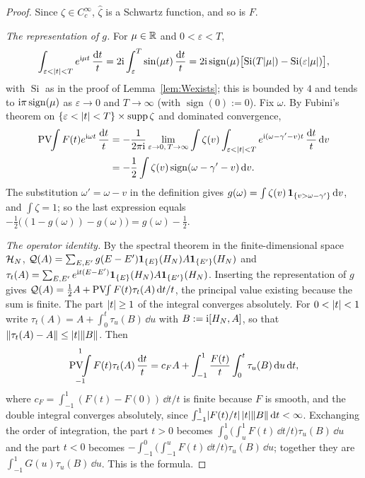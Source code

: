 \begin{proof}
Since $\zeta\in C_c^\infty$, $\hat\zeta$ is a Schwartz function, and so is $F$.

\emph{The representation of $g$.} For $\mu\in\mathbb{R}$ and $0<\varepsilon<T$,
\[
\int_{\varepsilon<\lvert t\rvert<T}e^{\mathrm{i}\mu t}\,\frac{\mathrm{d} t}t=2\mathrm{i}\int_\varepsilon^T\sin(\mu t)\,\frac{\mathrm{d} t}t
=2\mathrm{i}\operatorname{sign}(\mu)\bigl[\operatorname{Si}(T\lvert\mu\rvert)-\operatorname{Si}(\varepsilon\lvert\mu\rvert)\bigr],
\]
with $\operatorname{Si}$ as in the proof of Lemma~\ref{lem:Wexists}; this is bounded by $4$ and tends to
$\mathrm{i}\pi\operatorname{sign}(\mu)$ as $\varepsilon\to0$ and $T\to\infty$ (with $\operatorname{sign}(0):=0$). Fix $\omega$. By
Fubini's theorem on $\{\varepsilon<\lvert t\rvert<T\}\times\operatorname{supp}\zeta$ and dominated convergence,
\begin{align*}
\operatorname*{PV\!\!\int} F(t)e^{\mathrm{i}\omega t}\,\frac{\mathrm{d} t}t&=-\frac1{2\pi\mathrm{i}}\lim_{\varepsilon\to0,\,T\to\infty}\int\zeta(v)\int_{\varepsilon<\lvert t\rvert<T}e^{\mathrm{i}(\omega-\gamma'-v)t}\,\frac{\mathrm{d} t}t\,\mathrm{d} v\\
&=-\frac12\int\zeta(v)\operatorname{sign}(\omega-\gamma'-v)\,\mathrm{d} v .
\end{align*}
The substitution $\omega'=\omega-v$ in the definition gives $g(\omega)=\int\zeta(v)\,\mathbf{1}_{\{v>\omega-\gamma'\}}\,\mathrm{d} v$, and
$\int\zeta=1$; so the last expression equals $-\frac12\bigl((1-g(\omega))-g(\omega)\bigr)=g(\omega)-\frac12$.

\emph{The operator identity.} By the spectral theorem in the finite-dimensional space $\mathcal{H}_N$,
$\mathcal{Q}(A)=\sum_{E,E'}g(E-E')\mathbf{1}_{\{E\}}(H_N)A\mathbf{1}_{\{E'\}}(H_N)$ and
$\tau_t(A)=\sum_{E,E'}e^{\mathrm{i} t(E-E')}\mathbf{1}_{\{E\}}(H_N)A\mathbf{1}_{\{E'\}}(H_N)$. Inserting the representation of $g$ gives
$\mathcal{Q}(A)=\frac12A+\operatorname*{PV\!\!\int} F(t)\tau_t(A)\,\mathrm{d} t/t$, the principal value existing because the sum is finite. The part
$\lvert t\rvert\ge1$ of the integral converges absolutely. For $0<\lvert t\rvert<1$ write $\tau_t(A)=A+\int_0^t\tau_u(B)\,\dd u$ with
$B:=\mathrm{i}[H_N,A]$, so that $\lVert\tau_t(A)-A\rVert\le\lvert t\rvert\lVert B\rVert$. Then
\[
\operatorname*{PV\!\!\int}_{-1}^{1}F(t)\tau_t(A)\,\frac{\mathrm{d} t}t=c_FA+\int_{-1}^1\frac{F(t)}t\int_0^t\tau_u(B)\,\mathrm{d} u\,\mathrm{d} t,
\]
where $c_F=\int_{-1}^1(F(t)-F(0))\,\dd t/t$ is finite because $F$ is smooth, and the double integral converges absolutely,
since $\int_{-1}^1\lvert F(t)/t\rvert\,\lvert t\rvert\lVert B\rVert\,\mathrm{d} t<\infty$. Exchanging the order of integration, the part $t>0$ becomes
$\int_0^1\bigl(\int_u^1F(t)\,\dd t/t\bigr)\tau_u(B)\,\dd u$ and the part $t<0$ becomes
$-\int_{-1}^0\bigl(\int_{-1}^uF(t)\,\dd t/t\bigr)\tau_u(B)\,\dd u$; together they are $\int_{-1}^1G(u)\tau_u(B)\,\dd u$. This
is the formula.


\end{proof}

